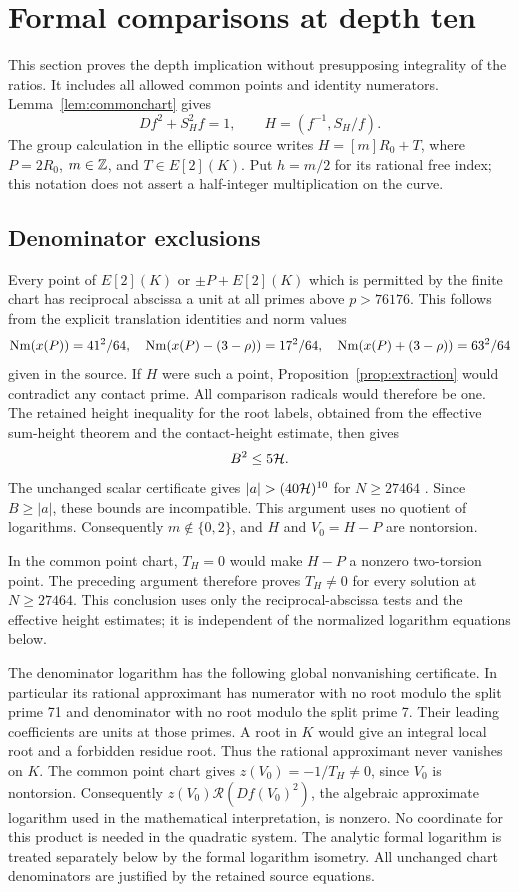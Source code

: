 \documentclass[11pt,a4paper]{article}
\theoremstyle{remark}\newtheorem{remark}[theorem]{Remark}
\begin{document}
\section{Formal comparisons at depth ten}\label{sec:formal}
This section proves the depth implication without presupposing
integrality of the ratios. It includes all allowed common points
and identity numerators. Lemma~\ref{lem:commonchart} gives
\[
 Df^2+S_H^2f=1,\qquad H=(f^{-1},S_H/f).
\]
The group calculation in the elliptic source writes
$H=[m]R_0+T$, where $P=2R_0$, $m\in\mathbb Z$, and $T\in E[2](K)$.
Put $h=m/2$ for its rational free index; this notation does not
assert a half-integer multiplication on the curve.

\subsection{Denominator exclusions}
Every point of $E[2](K)$ or $\pm P+E[2](K)$ which is permitted by
the finite chart has reciprocal abscissa a unit at all primes above
$p>76176$. This follows from the explicit translation identities
and norm values
\[
 \operatorname{Nm}(x(P))=41^2/64,\quad
 \operatorname{Nm}(x(P)-(3-\rho))=17^2/64,\quad
 \operatorname{Nm}(x(P)+(3-\rho))=63^2/64
\]
given in the source. If $H$ were such a point,
Proposition~\ref{prop:extraction} would contradict any contact prime.
All comparison radicals would therefore be one. The retained height
inequality for the root labels, obtained from the effective sum-height
theorem and the contact-height estimate, then gives
\[
 B^2\le5\mathcal H.
\]
The unchanged scalar certificate gives
$|a|>(40\HH)^{10}$ for $N\ge27464$
\cite[Section~4]{Explicit}. Since $B\ge|a|$, these bounds are
incompatible. This argument uses no quotient of
logarithms. Consequently $m\notin\{0,2\}$, and $H$ and $V_0=H-P$
are nontorsion.

In the common point chart, $T_H=0$ would make $H-P$ a nonzero
two-torsion point. The preceding argument therefore proves
$T_H\ne0$ for every solution at $N\ge27464$. This conclusion uses
only the reciprocal-abscissa tests and the effective height estimates;
it is independent of the normalized logarithm equations below.

The denominator logarithm has the following global nonvanishing
certificate. In particular its rational approximant
has numerator with no root modulo the split prime 71 and denominator
with no root modulo the split prime 7. Their leading coefficients are
units at those primes. A root in $K$ would give an integral local root
and a forbidden residue root. Thus the rational approximant never vanishes on $K$. The common point
chart gives $z(V_0)=-1/T_H\ne0$, since $V_0$ is nontorsion.
Consequently $z(V_0)\mathcal R(Df(V_0)^2)$, the algebraic approximate
logarithm used in the mathematical interpretation, is nonzero. No
coordinate for this product is needed in the quadratic system.
The analytic formal logarithm is treated separately below by the
formal logarithm isometry. All unchanged chart denominators are
justified by the retained source equations.
\end{document}
